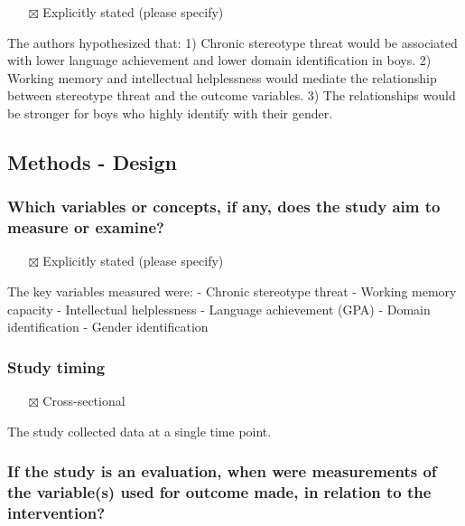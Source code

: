 \documentclass[
  doc, a4paper]{apa7}
\providecommand{\tightlist}{%
  \setlength{\itemsep}{0pt}\setlength{\parskip}{0pt}}
\begin{document}
\begin{itemize}
\tightlist
\item[$\boxtimes$]
  Explicitly stated (please specify)
\end{itemize}

The authors hypothesized that:
1) Chronic stereotype threat would be associated with lower language achievement and lower domain identification in boys.
2) Working memory and intellectual helplessness would mediate the relationship between stereotype threat and the outcome variables.
3) The relationships would be stronger for boys who highly identify with their gender.

\subsection{Methods - Design}\label{methods---design}

\subsubsection{Which variables or concepts, if any, does the study aim to measure or examine?}\label{which-variables-or-concepts-if-any-does-the-study-aim-to-measure-or-examine}

\begin{itemize}
\tightlist
\item[$\boxtimes$]
  Explicitly stated (please specify)
\end{itemize}

The key variables measured were:
- Chronic stereotype threat
- Working memory capacity
- Intellectual helplessness
- Language achievement (GPA)
- Domain identification
- Gender identification

\subsubsection{Study timing}\label{study-timing}

\begin{itemize}
\tightlist
\item[$\boxtimes$]
  Cross-sectional
\end{itemize}

The study collected data at a single time point.

\subsubsection{If the study is an evaluation, when were measurements of the variable(s) used for outcome made, in relation to the intervention?}\label{if-the-study-is-an-evaluation-when-were-measurements-of-the-variables-used-for-outcome-made-in-relation-to-the-intervention}
\end{document}

